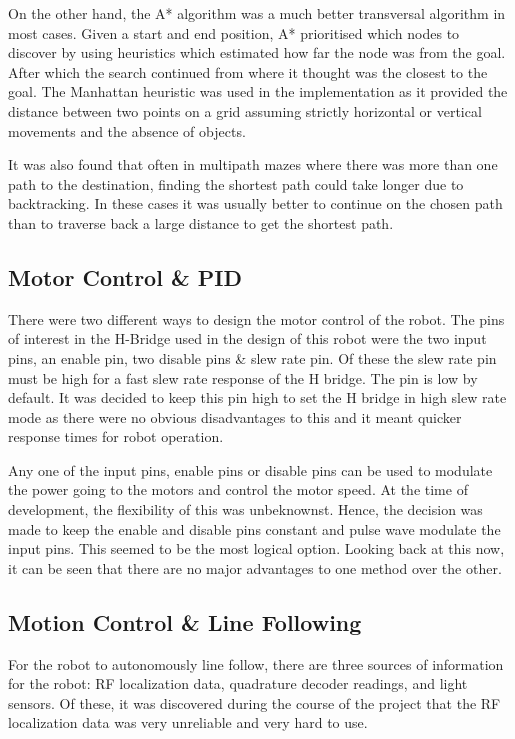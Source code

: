 \documentclass{article}
\begin{document}
On the other hand, the A* algorithm was a much better transversal algorithm in most cases. Given a start and end position, A* prioritised which nodes to discover by using heuristics which estimated how far the node was from the goal. After which the search continued from where it thought was the closest to the goal. The Manhattan heuristic was used in the implementation as it provided the distance between two points on a grid assuming strictly horizontal or vertical movements and the absence of objects.

It was also found that often in multipath mazes where there was more than one path to the destination, finding the shortest path could take longer due to backtracking. In these cases it was usually better to continue on the chosen path than to traverse back a large distance to get the shortest path.

\subsection{Motor Control \& PID}

There were two different ways to design the motor control of the robot. The pins of interest in the H-Bridge used in the design of this robot were the two input pins, an enable pin, two disable pins \& slew rate pin. Of these the slew rate pin must be high for a fast slew rate response of the H bridge. The pin is low by default. It was decided to keep this pin high to set the H bridge in high slew rate mode as there were no obvious disadvantages to this and it meant quicker response times for robot operation.

Any one of the input pins, enable pins or disable pins can be used to modulate the power going to the motors and control the motor speed. At the time of development, the flexibility of this was unbeknownst. Hence, the decision was made to keep the enable and disable pins constant and pulse wave modulate the input pins. This seemed to be the most logical option. Looking back at this now, it can be seen that there are no major advantages to one method over the other.

\subsection{Motion Control \& Line Following}

For the robot to autonomously line follow, there are three sources of information for the robot: RF localization data, quadrature decoder readings, and light sensors. Of these, it was discovered during the course of the project that the RF localization data was very unreliable and very hard to use.
\end{document}
